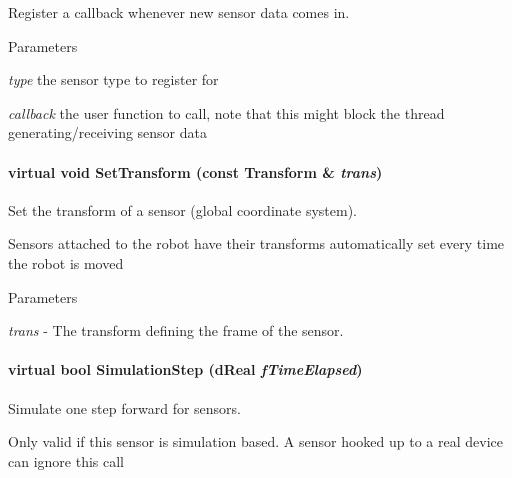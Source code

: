 Register a callback whenever new sensor data comes in. 


\begin{DoxyParams}{Parameters}
\item[{\em type}]the sensor type to register for \item[{\em callback}]the user function to call, note that this might block the thread generating/receiving sensor data \end{DoxyParams}
\hypertarget{classOpenRAVE_1_1SensorBase_a2b064fc102932710baf4ada2799d7236}{
\paragraph[{SetTransform}]{\setlength{\rightskip}{0pt plus 5cm}virtual void SetTransform (const Transform \& {\em trans})}\hfill}
\label{classOpenRAVE_1_1SensorBase_a2b064fc102932710baf4ada2799d7236}


Set the transform of a sensor (global coordinate system). 

Sensors attached to the robot have their transforms automatically set every time the robot is moved 
\begin{DoxyParams}{Parameters}
\item[{\em trans}]-\/ The transform defining the frame of the sensor. \end{DoxyParams}
\hypertarget{classOpenRAVE_1_1SensorBase_afa04259a5131e4b12c964d7c66d7c89a}{
\paragraph[{SimulationStep}]{\setlength{\rightskip}{0pt plus 5cm}virtual bool SimulationStep (dReal {\em fTimeElapsed})}\hfill}
\label{classOpenRAVE_1_1SensorBase_afa04259a5131e4b12c964d7c66d7c89a}


Simulate one step forward for sensors. 

Only valid if this sensor is simulation based. A sensor hooked up to a real device can ignore this call 